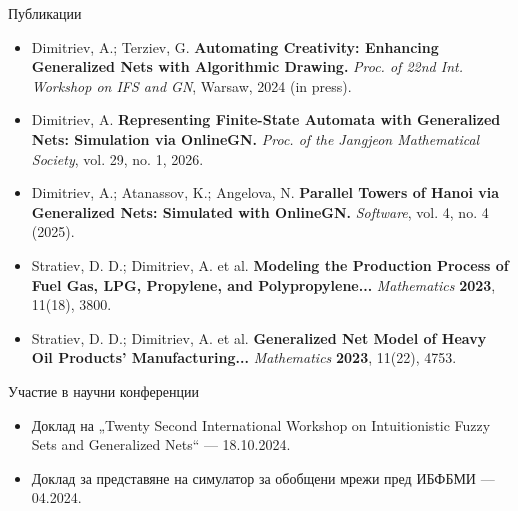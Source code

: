 \documentclass[aspectratio=169]{beamer}
\begin{document}
\begin{frame}{Публикации}
\footnotesize 
\begin{itemize}
    \setlength{\itemsep}{8pt}

    \item Dimitriev, A.; Terziev, G. \textbf{Automating Creativity: Enhancing Generalized Nets with Algorithmic Drawing.} \textit{Proc. of 22nd Int. Workshop on IFS and GN}, Warsaw, 2024 (in press).

    \item Dimitriev, A. \textbf{Representing Finite-State Automata with Generalized Nets: Simulation via OnlineGN.} \textit{Proc. of the Jangjeon Mathematical Society}, vol. 29, no. 1, 2026.

    \item Dimitriev, A.; Atanassov, K.; Angelova, N. \textbf{Parallel Towers of Hanoi via Generalized Nets: Simulated with OnlineGN.} \textit{Software}, vol. 4, no. 4 (2025).

    \item Stratiev, D. D.; Dimitriev, A. et al. \textbf{Modeling the Production Process of Fuel Gas, LPG, Propylene, and Polypropylene...} \textit{Mathematics} \textbf{2023}, 11(18), 3800.

    \item Stratiev, D. D.; Dimitriev, A. et al. \textbf{Generalized Net Model of Heavy Oil Products' Manufacturing...} \textit{Mathematics} \textbf{2023}, 11(22), 4753.
\end{itemize}
\end{frame}

\begin{frame}{Участие в научни конференции}
\begin{itemize}
    \setlength{\itemsep}{1.5em} 
    
    \item Доклад на „Twenty Second International Workshop on Intuitionistic Fuzzy Sets and Generalized Nets“ --- 18.10.2024.
    
    \item Доклад за представяне на симулатор за обобщени мрежи пред ИБФБМИ --- 04.2024.
\end{itemize}
\end{frame}
\end{document}
